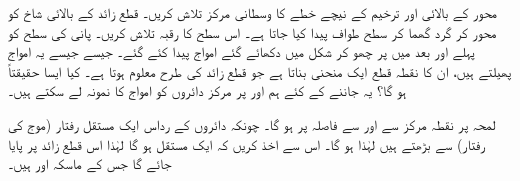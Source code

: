محور  کے بالائی اور ترخیم  کے نیچے  خطے کا وسطانی مرکز تلاش کریں۔ 
قطع زائد  کے بالائی شاخ  کو  محور کر گرد گھما کر سطح طواف پیدا کیا جاتا ہے۔ اس سطح کا رقبہ تلاش کریں۔
پانی کی سطح کو پہلے  اور بعد میں  پر چھو کر شکل  میں دکھائے گئے امواج پیدا کئے گئے۔ جیسے جیسے یہ امواج پھیلتے ہیں، ان کا نقطہ قطع ایک منحنی بناتا ہے جو قطع زائد کی طرح معلوم ہوتا ہے۔ کیا ایسا حقیقتاً ہو گا؟  یہ جاننے کے کئے ہم  اور  پر مرکز دائروں کو امواج کا نمونہ لے سکتے ہیں۔

لمحہ  پر نقطہ  مرکز  سے   اور  سے  فاصلہ پر ہو گا۔ چونکہ دائروں کے رداس ایک مستقل رفتار (موج کی رفتار) سے بڑھتے ہیں لہٰذا  ہو گا۔ اس سے اخذ کریں کہ
  ایک مستقل ہو گا لہٰذا  اس قطع زائد پر پایا جائے گا جس کے ماسکہ  اور  ہیں۔
